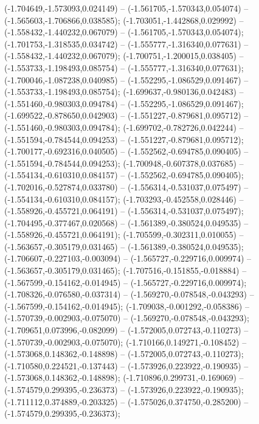  (-1.704649,-1.573093,0.024149) -- (-1.561705,-1.570343,0.054074) -- (-1.565603,-1.706866,0.038585);
 (-1.703051,-1.442868,0.029992) -- (-1.558432,-1.440232,0.067079) -- (-1.561705,-1.570343,0.054074);
 (-1.701753,-1.318535,0.034742) -- (-1.555777,-1.316340,0.077631) -- (-1.558432,-1.440232,0.067079);
 (-1.700751,-1.200015,0.038405) -- (-1.553733,-1.198493,0.085754) -- (-1.555777,-1.316340,0.077631);
 (-1.700046,-1.087238,0.040985) -- (-1.552295,-1.086529,0.091467) -- (-1.553733,-1.198493,0.085754);
 (-1.699637,-0.980136,0.042483) -- (-1.551460,-0.980303,0.094784) -- (-1.552295,-1.086529,0.091467);
 (-1.699522,-0.878650,0.042903) -- (-1.551227,-0.879681,0.095712) -- (-1.551460,-0.980303,0.094784);
 (-1.699702,-0.782726,0.042244) -- (-1.551594,-0.784544,0.094253) -- (-1.551227,-0.879681,0.095712);
 (-1.700177,-0.692316,0.040505) -- (-1.552562,-0.694785,0.090405) -- (-1.551594,-0.784544,0.094253);
 (-1.700948,-0.607378,0.037685) -- (-1.554134,-0.610310,0.084157) -- (-1.552562,-0.694785,0.090405);
 (-1.702016,-0.527874,0.033780) -- (-1.556314,-0.531037,0.075497) -- (-1.554134,-0.610310,0.084157);
 (-1.703293,-0.452558,0.028446) -- (-1.558926,-0.455721,0.064191) -- (-1.556314,-0.531037,0.075497);
 (-1.704495,-0.377467,0.020568) -- (-1.561389,-0.380524,0.049535) -- (-1.558926,-0.455721,0.064191);
 (-1.705599,-0.302311,0.010055) -- (-1.563657,-0.305179,0.031465) -- (-1.561389,-0.380524,0.049535);
 (-1.706607,-0.227103,-0.003094) -- (-1.565727,-0.229716,0.009974) -- (-1.563657,-0.305179,0.031465);
 (-1.707516,-0.151855,-0.018884) -- (-1.567599,-0.154162,-0.014945) -- (-1.565727,-0.229716,0.009974);
 (-1.708326,-0.076580,-0.037314) -- (-1.569270,-0.078548,-0.043293) -- (-1.567599,-0.154162,-0.014945);
 (-1.709038,-0.001292,-0.058386) -- (-1.570739,-0.002903,-0.075070) -- (-1.569270,-0.078548,-0.043293);
 (-1.709651,0.073996,-0.082099) -- (-1.572005,0.072743,-0.110273) -- (-1.570739,-0.002903,-0.075070);
 (-1.710166,0.149271,-0.108452) -- (-1.573068,0.148362,-0.148898) -- (-1.572005,0.072743,-0.110273);
 (-1.710580,0.224521,-0.137443) -- (-1.573926,0.223922,-0.190935) -- (-1.573068,0.148362,-0.148898);
 (-1.710896,0.299731,-0.169069) -- (-1.574579,0.299395,-0.236373) -- (-1.573926,0.223922,-0.190935);
 (-1.711112,0.374889,-0.203325) -- (-1.575026,0.374750,-0.285200) -- (-1.574579,0.299395,-0.236373);
